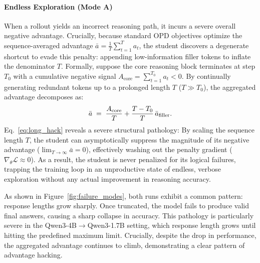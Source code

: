 \documentclass[11pt]{article}
\begin{document}
\paragraph{Endless Exploration (Mode A)}
When a rollout yields an incorrect reasoning path, it incurs a severe overall negative advantage. Crucially, because standard OPD objectives optimize the sequence-averaged advantage $\bar{a} = \frac{1}{T}\sum_{t=1}^{T} a_t$, the student discovers a degenerate shortcut to evade this penalty: appending low-information filler tokens to inflate the denominator $T$. 
Formally, suppose the core reasoning block terminates at step $T_0$ with a cumulative negative signal $A_{\text{core}} = \sum_{t=1}^{T_0} a_t < 0$. By continually generating redundant tokens up to a prolonged length $T$ ($T \gg T_0$), the aggregated advantage decomposes as:
\begin{equation}
\label{eq:long_hack}
\small
\bar{a}
\;=\; \frac{A_{\text{core}}}{T} + \frac{T - T_0}{T}\,\bar{a}_{\text{filler}}.
\end{equation}
Eq.~\eqref{eq:long_hack} reveals a severe structural pathology: 
By scaling the sequence length $T$, the student can asymptotically suppress the magnitude of its negative advantage ($\lim_{T \to \infty} \bar{a} = 0$), effectively washing out the penalty gradient ($\nabla_\theta \mathcal{L} \approx 0$). As a result, the student is never penalized for its logical failures, trapping the training loop in an unproductive state of endless, verbose exploration without any actual improvement in reasoning accuracy.

As shown in Figure~\ref{fig:failure_modes}, both runs exhibit a common pattern: response lengths grow sharply.
Once truncated, the model fails to produce valid final answers, causing a sharp collapse in accuracy.
This pathology is particularly severe in the {Qwen3-4B}$\rightarrow${Qwen3-1.7B} setting, which response length grows until hitting the predefined maximum limit.   
Crucially, despite the drop in performance, the aggregated advantage continues to climb, demonstrating a clear pattern of advantage hacking.
\end{document}
